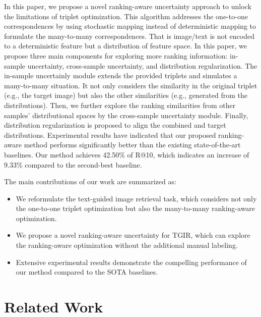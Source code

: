 \documentclass[letterpaper]{article} \usepackage{aaai24}  \usepackage{times}  \usepackage{helvet}  \usepackage{courier}  \usepackage[hyphens]{url}  \usepackage{graphicx} \urlstyle{rm} \def\UrlFont{\rm}  \usepackage{natbib}  \usepackage{caption} \frenchspacing  \setlength{\pdfpagewidth}{8.5in} \setlength{\pdfpageheight}{11in} \usepackage{amsmath,amsfonts}
\begin{document}
In this paper, we propose a novel ranking-aware uncertainty approach to unlock the limitations of triplet optimization. This algorithm addresses the one-to-one correspondences by using stochastic mapping instead of deterministic mapping to formulate the many-to-many correspondences. That is image/text is not encoded to a deterministic feature but a distribution of feature space. In this paper, we propose three main components for exploring more ranking information: in-sample uncertainty, cross-sample uncertainty, and distribution regularization. The in-sample uncertainly module extends the provided triplets and simulates a many-to-many situation. It not only considers the similarity in the original triplet (e.g., the target image) but also the other similarities  (e.g., generated from the distributions). Then, we further explore the ranking similarities from other samples' distributional spaces by the cross-sample uncertainty module. Finally, distribution regularization is proposed to align the combined and target distributions. Experimental results have indicated that our proposed ranking-aware method performs significantly better than the existing state-of-the-art baselines. Our method achieves 42.50\% of R@10, which indicates an increase of 9.33\% compared to the second-best baseline. 


 The main contributions of our work are summarized as:
 \begin{itemize}
     \item We reformulate the text-guided image retrieval task, which considers not only the one-to-one triplet optimization but also the many-to-many ranking-aware optimization. 

     \item We propose a novel ranking-aware uncertainty for TGIR, which can explore the ranking-aware optimization without the additional manual labeling. 

     \item Extensive experimental results demonstrate the compelling performance of our method compared to the SOTA baselines.
 \end{itemize}

\section{Related Work}
\end{document}
